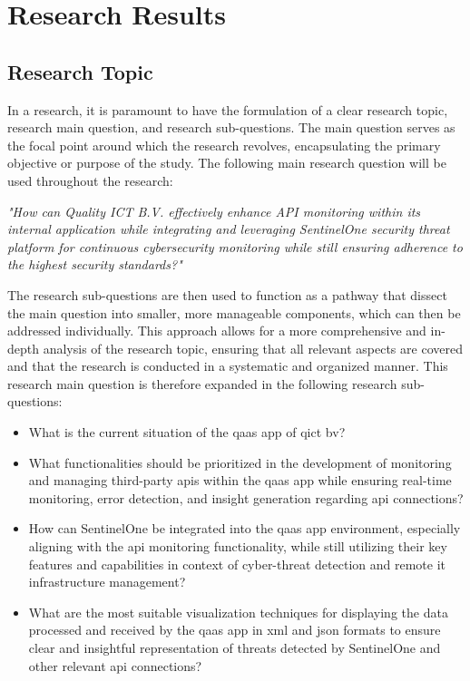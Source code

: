 \chapter{Research Results}
\begin{multicols}{2}
      \section{Research Topic}
      In a research, it is paramount to have the formulation of a clear research topic, research main question,
      and research sub-questions. The main question serves as the focal point around which the research revolves,
      encapsulating the primary objective or purpose of the study.
      The following main research question will be used throughout the research:
      \begin{center}
            \textit{"How can Quality ICT B.V. effectively enhance API monitoring within its internal application
                  while integrating and leveraging SentinelOne security threat platform for continuous
                  cybersecurity monitoring while still ensuring adherence to the highest security standards?"}
      \end{center}
      The research sub-questions are then used to function as a pathway that dissect the main
      question into smaller, more manageable components, which can then be addressed individually. This approach
      allows for a more comprehensive and in-depth analysis of the research topic, ensuring that all relevant
      aspects are covered and that the research is conducted in a systematic and organized manner.
      This research main question is therefore expanded in the following research sub-questions: %
      \begin{itemize}
            \item What is the current situation of the \acrshort{qaas} app of \acrlong{qict} \acrshort{bv}?
            \item What functionalities should be prioritized in the development of monitoring and managing
                  third-party \acrshort{api}s within the \acrshort{qaas} app while ensuring real-time monitoring,
                  error detection, and insight generation regarding \acrshort{api} connections?
            \item How can SentinelOne be integrated into the \acrshort{qaas} app environment, especially
                  aligning with the \acrshort{api} monitoring functionality, while still utilizing their key
                  features and capabilities in context of cyber-threat detection and remote \acrshort{it}
                  infrastructure management?
            \item What are the most suitable visualization techniques for displaying the data processed and
                  received by the \acrshort{qaas} app in \acrshort{xml} and \acrshort{json} formats to ensure
                  clear and insightful representation of threats detected by SentinelOne and other relevant
                  \acrshort{api} connections?
      \end{itemize}

\end{multicols}
